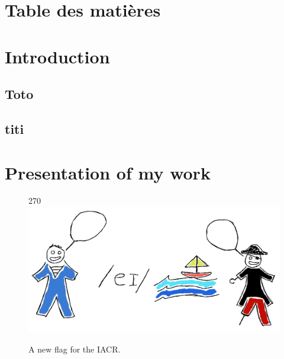 

\cleardoublepage
\chapter*{Table des matières}
\parttoc


\chapter[Introduction]{Introduction}
\section{Toto}
\section{titi}

\chapter[Présentation de mes travaux]{Presentation of my work}








\begin{figure}[!htb]
\begin{center}
\begin{turn}{270}
\includegraphics[scale=0.8]{iacr_coloured.png}
\end{turn}
\end{center}
\caption{A new flag for the IACR.\label{fig:iacr_flag}}
\end{figure}


